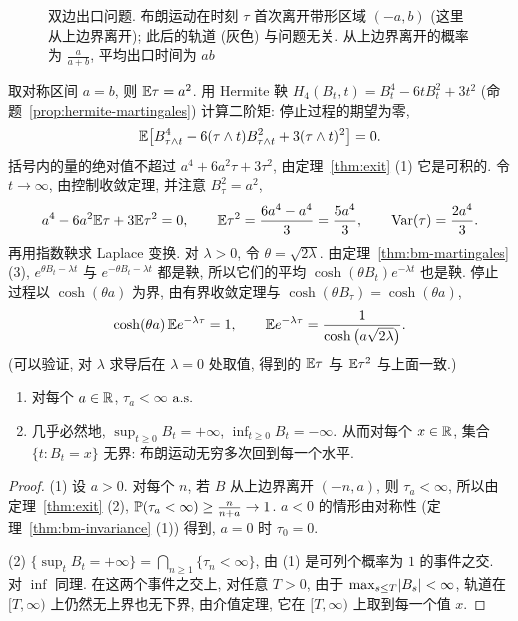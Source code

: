 \begin{figure}[htbp]
\caption{双边出口问题. 布朗运动在时刻 $\tau$ 首次离开带形区域 $(-a,b)$ (这里从上边界离开); 此后的轨道 (灰色) 与问题无关. 从上边界离开的概率为 $\frac{a}{a+b}$, 平均出口时间为 $ab$}
\label{fig:exit}
\end{figure}

\begin{example}\label{ex:exit-moments}
取对称区间 $a=b$, 则 $\E\tau=a^2$. 用 Hermite 鞅 $H_4(B_t,t)=B_t^4-6tB_t^2+3t^2$ (命题~\ref{prop:hermite-martingales}) 计算二阶矩: 停止过程的期望为零,
\[
\E\big[B_{\tau\wedge t}^4-6(\tau\wedge t)B_{\tau\wedge t}^2+3(\tau\wedge t)^2\big]=0.
\]
括号内的量的绝对值不超过 $a^4+6a^2\tau+3\tau^2$, 由定理~\ref{thm:exit} (1) 它是可积的. 令 $t\to\infty$, 由控制收敛定理, 并注意 $B_\tau^2=a^2$,
\[
a^4-6a^2\E\tau+3\E\tau^2=0,\qquad \E\tau^2=\frac{6a^4-a^4}{3}=\frac{5a^4}{3},\qquad\Var(\tau)=\frac{2a^4}{3}.
\]
再用指数鞅求 Laplace 变换. 对 $\lambda>0$, 令 $\theta=\sqrt{2\lambda}$. 由定理~\ref{thm:bm-martingales} (3), $e^{\theta B_t-\lambda t}$ 与 $e^{-\theta B_t-\lambda t}$ 都是鞅, 所以它们的平均 $\cosh(\theta B_t)e^{-\lambda t}$ 也是鞅. 停止过程以 $\cosh(\theta a)$ 为界, 由有界收敛定理与 $\cosh(\theta B_\tau)=\cosh(\theta a)$,
\[
\cosh(\theta a)\,\E e^{-\lambda\tau}=1,\qquad \E e^{-\lambda\tau}=\frac{1}{\cosh\big(a\sqrt{2\lambda}\big)}.
\]
(可以验证, 对 $\lambda$ 求导后在 $\lambda=0$ 处取值, 得到的 $\E\tau$ 与 $\E\tau^2$ 与上面一致.)
\end{example}

\begin{corollary}[常返性]\label{cor:bm-recurrence}
\begin{enumerate}
\item 对每个 $a\in\R$, $\tau_a<\infty$ $\as$
\item 几乎必然地, $\sup_{t\ge0}B_t=+\infty$, $\inf_{t\ge0}B_t=-\infty$. 从而对每个 $x\in\R$, 集合 $\{t: B_t=x\}$ 无界: 布朗运动无穷多次回到每一个水平.
\end{enumerate}
\end{corollary}

\begin{proof}
(1) 设 $a>0$. 对每个 $n$, 若 $B$ 从上边界离开 $(-n,a)$, 则 $\tau_a<\infty$, 所以由定理~\ref{thm:exit} (2), $\P(\tau_a<\infty)\ge\frac{n}{n+a}\to1$. $a<0$ 的情形由对称性 (定理~\ref{thm:bm-invariance} (1)) 得到, $a=0$ 时 $\tau_0=0$.

(2) $\{\sup_tB_t=+\infty\}=\bigcap_{n\ge1}\{\tau_n<\infty\}$, 由 (1) 是可列个概率为 $1$ 的事件之交. 对 $\inf$ 同理. 在这两个事件之交上, 对任意 $T>0$, 由于 $\max_{s\le T}\abs{B_s}<\infty$, 轨道在 $[T,\infty)$ 上仍然无上界也无下界, 由介值定理, 它在 $[T,\infty)$ 上取到每一个值 $x$.
\end{proof}

